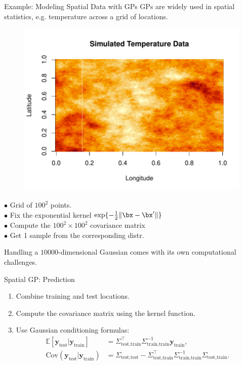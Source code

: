 \documentclass[11pt,handout,aspectratio=169]{beamer}
\begin{document}
\begin{frame}{Example: Modeling Spatial Data with GPs}
GPs are widely used in spatial statistics, e.g. temperature across a grid of locations.\\[3mm]
\begin{minipage}{7cm}
	\begin{figure}
	\includegraphics[width=
	\textwidth]{pics/GP_temp.pdf}
\end{figure}
\end{minipage}\begin{minipage}{8cm}
$\bullet$	Grid of $100^2$ points. \\[2mm]
$\bullet$ Fix the exponential kernel $\exp\{-\tfrac12\|\bx-\bx'\|\}$\\[2mm]
$\bullet$ Compute the $100^2\times 100^2$ covariance matrix\\[2mm]
$\bullet$ Get 1 sample from the corresponding distr.\\[2mm]
\end{minipage}
Handling a $10000$-dimensional Gaussian comes with its own computational challenges.  
\end{frame}

\begin{frame}{Spatial GP: Prediction}
\begin{enumerate}
    \item Combine training and test locations.
    \item Compute the covariance matrix using the kernel function.
    \item Use Gaussian conditioning formulas:
    \begin{align*}
        \mathbb{E}[\mathbf{y}_\text{test} | \mathbf{y}_\text{train}] &= \Sigma_\text{test,train}^\top \Sigma_\text{train,train}^{-1} \mathbf{y}_\text{train}, \\
        \text{Cov}(\mathbf{y}_\text{test} | \mathbf{y}_\text{train}) &= \Sigma_\text{test,test} - \Sigma_\text{test,train}^\top \Sigma_\text{train,train}^{-1} \Sigma_\text{test,train}.
    \end{align*}
\end{enumerate}
\end{frame}
\end{document}
